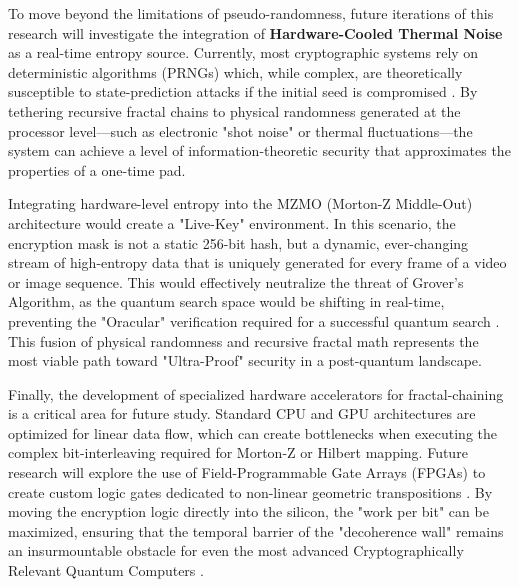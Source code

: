 \documentclass[12pt,fleqn]{article}
\begin{document}
To move beyond the limitations of pseudo-randomness, future iterations of this research will investigate the integration of \textbf{Hardware-Cooled Thermal Noise} as a real-time entropy source. Currently, most cryptographic systems rely on deterministic algorithms (PRNGs) which, while complex, are theoretically susceptible to state-prediction attacks if the initial seed is compromised \cite{stinson2018cryptography}. By tethering recursive fractal chains to physical randomness generated at the processor level—such as electronic "shot noise" or thermal fluctuations—the system can achieve a level of information-theoretic security that approximates the properties of a one-time pad.

Integrating hardware-level entropy into the MZMO (Morton-Z Middle-Out) architecture would create a "Live-Key" environment. In this scenario, the encryption mask is not a static 256-bit hash, but a dynamic, ever-changing stream of high-entropy data that is uniquely generated for every frame of a video or image sequence. This would effectively neutralize the threat of Grover's Algorithm, as the quantum search space would be shifting in real-time, preventing the "Oracular" verification required for a successful quantum search \cite{grover1996fast}. This fusion of physical randomness and recursive fractal math represents the most viable path toward "Ultra-Proof" security in a post-quantum landscape.

Finally, the development of specialized hardware accelerators for fractal-chaining is a critical area for future study. Standard CPU and GPU architectures are optimized for linear data flow, which can create bottlenecks when executing the complex bit-interleaving required for Morton-Z or Hilbert mapping. Future research will explore the use of Field-Programmable Gate Arrays (FPGAs) to create custom logic gates dedicated to non-linear geometric transpositions \cite{gidney2021factor}. By moving the encryption logic directly into the silicon, the "work per bit" can be maximized, ensuring that the temporal barrier of the "decoherence wall" remains an insurmountable obstacle for even the most advanced Cryptographically Relevant Quantum Computers \cite{preskill2018quantum}.
\end{document}
